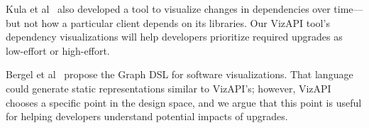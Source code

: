 Kula et al~\cite{kula14:_visual_evolut_system_their_librar_depen} also developed a tool
to visualize changes in dependencies over time---but not how a particular client depends on its libraries. 
Our VizAPI tool's dependency visualizations will help developers
prioritize required upgrades as low-effort or high-effort.
 

Bergel et al~\cite{bergel14:_domain_specif_languag_visual_softw_depen_graph} propose the {\sc Graph} DSL
for software visualizations. That language could generate static representations similar to VizAPI's; however,
VizAPI chooses a specific point in the design space, and we argue that this point is useful for helping developers understand
potential impacts of upgrades.

